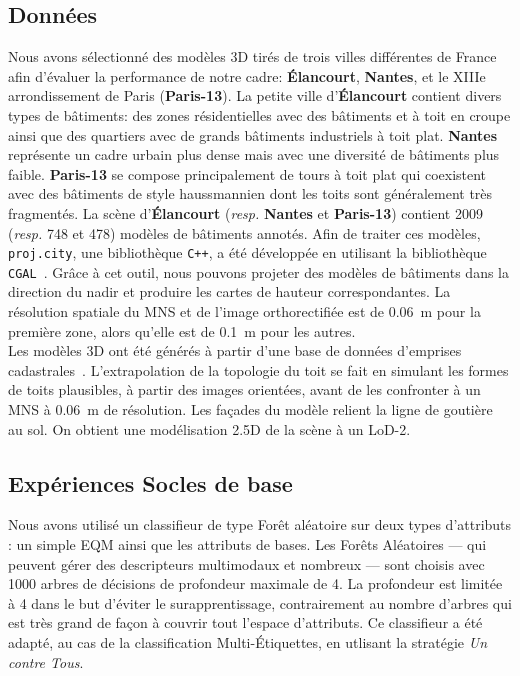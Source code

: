     \subsection*{Données}
        Nous avons sélectionné des modèles 3D tirés de trois villes différentes de France afin d'évaluer la performance de notre cadre: \textbf{\'Elancourt}, \textbf{Nantes}, et le XIIIe arrondissement de Paris (\textbf{Paris-13}).
        La petite ville d'\textbf{\'Elancourt} contient divers types de bâtiments: des zones résidentielles avec des bâtiments et à toit en croupe ainsi que des quartiers avec de grands bâtiments industriels à toit plat.
        \textbf{Nantes} représente un cadre urbain plus dense mais avec une diversité de bâtiments plus faible.
        \textbf{Paris-13} se compose principalement de tours à toit plat qui coexistent avec des bâtiments de style haussmannien dont les toits sont généralement très fragmentés.
        La scène d'\textbf{\'Elancourt} (\textit{resp.} \textbf{Nantes} et \textbf{Paris-13}) contient \num[locale=FR]{2009} (\textit{resp.} \num[locale=FR]{748} et \num[locale=FR]{478}) modèles de bâtiments annotés.
        Afin de traiter ces modèles, \verb!proj.city!, une bibliothèque \verb!C++!, a été développée en utilisant la bibliothèque \verb!CGAL!~\parencite{fabri2000design}.
        Grâce à cet outil, nous pouvons projeter des modèles de bâtiments dans la direction du nadir et produire les cartes de hauteur correspondantes.
        La résolution spatiale du MNS et de l'image orthorectifiée est de \SI[locale=FR]{0.06}{\m} pour la première zone, alors qu'elle est de \SI[locale=FR]{0.1}{\m} pour les autres.\\

        Les modèles 3D ont été générés à partir d'une base de données d'emprises cadastrales~\parencite{durupt2006automatic}.
        L'extrapolation de la topologie du toit se fait en simulant les formes de toits plausibles, à partir des images orientées, avant de les confronter à un MNS à \SI[locale=FR]{0,06}{\m} de résolution.
        Les façades du modèle relient la ligne de goutière au sol.
        On obtient une modélisation 2.5D de la scène à un LoD-2.

    \subsection*{Expériences Socles de base}
        Nous avons utilisé un classifieur de type Forêt aléatoire sur deux types d'attributs : un simple EQM ainsi que les attributs de bases.
        Les Forêts Aléatoires --- qui peuvent gérer des descripteurs multimodaux et nombreux --- sont choisis avec \num[locale=FR]{1000} arbres de décisions de profondeur maximale de \num[locale=FR]{4}.
        La profondeur est limitée à 4 dans le but d'éviter le surapprentissage, contrairement au nombre d'arbres qui est très grand de façon à couvrir tout l'espace d'attributs.
        Ce classifieur a été adapté, au cas de la classification Multi-\'Etiquettes, en utlisant la stratégie \textit{Un contre Tous}.\\

